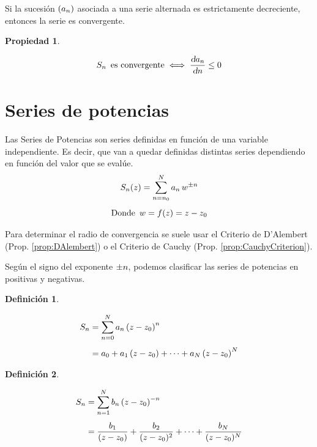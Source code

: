 \documentclass[a5paper,12pt,twoside]{book}
\newtheorem{defn}{{Definición}}[chapter]
\newtheorem{prop}{{Propiedad}}[chapter]
\begin{document}
Si la sucesión $(a_n)$ asociada a una serie alternada es estrictamente decreciente, entonces la serie es convergente.

\begin{mdframed}[style=MyFrame1]
    \begin{prop}
    \end{prop}
    \begin{equation*}
        S_n \enspace \textrm{es convergente} \iff \frac{\textsl{d} a_n}{\textsl{d} n} \leq 0
    \end{equation*}
\end{mdframed}


\section{Series de potencias}

Las Series de Potencias son series definidas en función de una variable independiente. Es decir, que van a quedar definidas distintas series dependiendo en función del valor que se evalúe.
\begin{gather*}
    S_n(z) = \sum_{n=n_0}^N a_n \, w^{\pm n}
    \\[1ex]
    \textrm{Donde} \enspace w = f(z) = z-z_0
\end{gather*}

Para determinar el radio de convergencia se suele usar el Criterio de D'Alembert (Prop. \ref{prop:DAlembert}) o el Criterio de Cauchy (Prop. \ref{prop:CauchyCriterion}).

Según el signo del exponente $\pm n$, podemos clasificar las series de potencias en positivas y negativas.

\begin{mdframed}[style=MyFrame1]
    \begin{defn}
        \label{defn:posPowerSeries}
    \end{defn}
    \begin{align*}
        S_n &= \sum_{n=0}^N a_n \left( z-z_0 \right)^n
        \\[1ex]
        &= a_0 + a_1 \left( z-z_0 \right) + \dots + a_N \left( z-z_0 \right)^N
    \end{align*}
\end{mdframed}

\begin{mdframed}[style=MyFrame1]
    \begin{defn}
    \end{defn}
    \begin{align*}
        S_n &= \sum_{n=1}^N b_n \left( z-z_0 \right)^{-n}
        \\[1ex]
        &= \frac{b_1}{(z-z_0)} + \frac{b_2}{(z-z_0)^2} + \dots + \frac{b_N}{(z-z_0)^N}
    \end{align*}
\end{mdframed}
\end{document}
